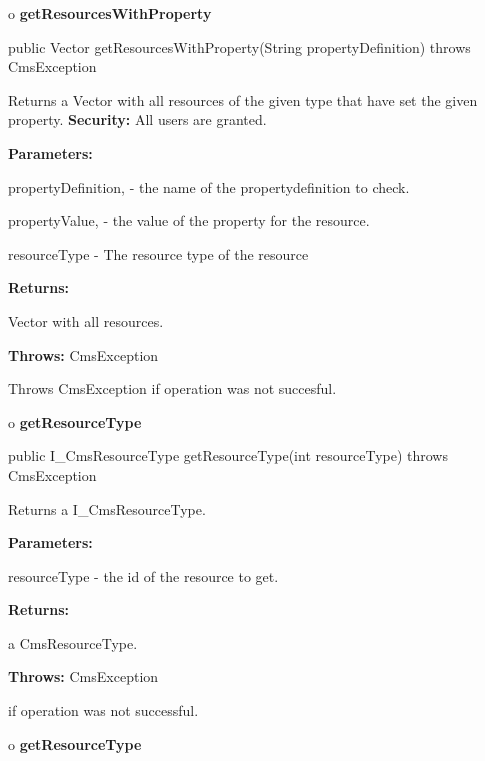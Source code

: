 o {\bf getResourcesWithProperty} 

\begin{PRE}
 public Vector getResourcesWithProperty(String propertyDefinition) throws CmsException
\end{PRE}

\begin{description}
\htmlDD Returns a Vector with all resources of the given type that have set
the given property. {\bf Security:} All users are granted. 

\begin{description}
\item {\bf Parameters:}  

propertyDefinition, - the name of the propertydefinition to check.  

propertyValue, - the value of the property for the resource.  

resourceType - The resource type of the resource  
\item {\bf Returns:}  

Vector with all resources.  
\item {\bf Throws:} CmsException  

Throws CmsException if operation was not succesful.  
\end{description}

\end{description}

o {\bf getResourceType} 

\begin{PRE}
 public I\_CmsResourceType getResourceType(int resourceType) throws CmsException
\end{PRE}

\begin{description}
\htmlDD Returns a I\_CmsResourceType. 

\begin{description}
\item {\bf Parameters:}  

resourceType - the id of the resource to get.  
\item {\bf Returns:}  

a CmsResourceType.  
\item {\bf Throws:} CmsException  

if operation was not successful.  
\end{description}

\end{description}

o {\bf getResourceType} 

